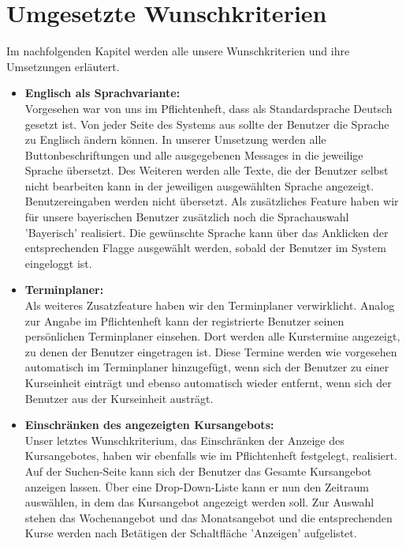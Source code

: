 \chapter{Umgesetzte Wunschkriterien}
Im nachfolgenden Kapitel werden alle unsere Wunschkriterien und ihre Umsetzungen erläutert. \ \\

\begin{itemize}
	\item \textbf{Englisch als Sprachvariante:} \\Vorgesehen war von uns im Pflichtenheft, dass als Standardsprache Deutsch gesetzt ist. Von jeder Seite des Systems aus sollte der Benutzer die Sprache zu Englisch ändern können. In unserer Umsetzung werden alle Buttonbeschriftungen und alle ausgegebenen Messages in die jeweilige Sprache übersetzt. Des Weiteren werden alle Texte, die der Benutzer selbst nicht bearbeiten kann in der jeweiligen ausgewählten Sprache angezeigt. Benutzereingaben werden nicht übersetzt. Als zusätzliches Feature haben wir für unsere bayerischen Benutzer zusätzlich noch die Sprachauswahl 'Bayerisch' realisiert. Die gewünschte Sprache kann über das Anklicken der entsprechenden Flagge ausgewählt werden, sobald der Benutzer im System eingeloggt ist.
	\item \textbf{Terminplaner:}\\ Als weiteres Zusatzfeature haben wir den Terminplaner verwirklicht. Analog zur Angabe im Pflichtenheft kann der registrierte Benutzer seinen persönlichen Terminplaner einsehen. Dort werden alle Kurstermine angezeigt, zu denen der Benutzer eingetragen ist. Diese Termine werden wie vorgesehen automatisch im Terminplaner hinzugefügt, wenn sich der Benutzer zu einer Kurseinheit einträgt und ebenso automatisch wieder entfernt, wenn sich der Benutzer aus der Kurseinheit austrägt.
	\item \textbf{Einschränken des angezeigten Kursangebots:}\\ Unser letztes Wunschkriterium, das Einschränken der Anzeige des Kursangebotes, haben wir ebenfalls wie im Pflichtenheft festgelegt, realisiert. Auf der Suchen-Seite kann sich der Benutzer das Gesamte Kursangebot anzeigen lassen. Über eine Drop-Down-Liste kann er nun den Zeitraum auswählen, in dem das Kursangebot angezeigt werden soll. Zur Auswahl stehen das Wochenangebot und das Monatsangebot und die entsprechenden Kurse werden nach Betätigen der Schaltfläche 'Anzeigen' aufgelistet.
\end{itemize} 